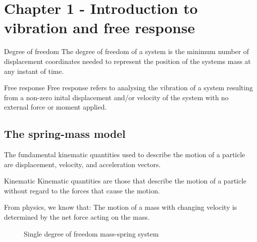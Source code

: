 \chapter{Chapter 1 - Introduction to vibration and free response}

  \begin{fmd-definition}{Degree of freedom}
    The degree of freedom of a system is the minimum number of displacement coordinates needed to represent the position of the systems mass at any instant of time.
  \end{fmd-definition}

  \begin{fmd-definition}{Free response}
    Free response refers to analysing the vibration of a system resulting from a non-zero inital displacement and/or velocity of the system with no external force or moment applied.
  \end{fmd-definition}

  \section{The spring-mass model}
    The fundamental kinematic quantities used to describe the motion of a particle are displacement, velocity, and acceleration vectors.

    \begin{fmd-definition}{Kinematic}
      Kinematic quantities are those that describe the motion of a particle without regard to the forces that cause the motion.
    \end{fmd-definition}

    From physics, we know that: The motion of a mass with changing velocity is determined by the net force acting on the mass.
    \begin{figure}
      \centering
      \caption{Single degree of freedom mass-spring system}\label{fig:single-dof-mass-spring}
    \end{figure}

